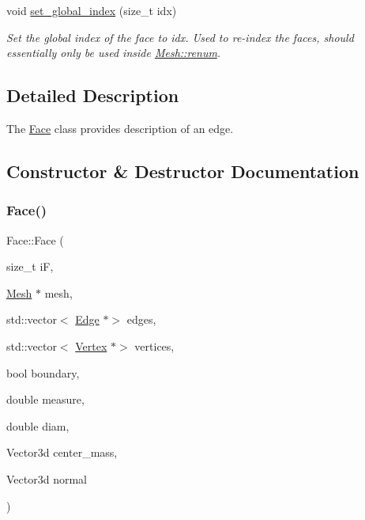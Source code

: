 \begin{DoxyCompactItemize}
\mbox{\label{classHArDCore3D_1_1Face_a66289e0a31138cfce6ac948f09423548}} 
void \hyperlink{classHArDCore3D_1_1Face_a66289e0a31138cfce6ac948f09423548}{set\+\_\+global\+\_\+index} (size\+\_\+t idx)
\begin{DoxyCompactList}\small\item\em Set the global index of the face to idx. Used to re-\/index the faces, should essentially only be used inside \hyperlink{classHArDCore3D_1_1Mesh_af77873bbc892a7a5b37bf4773c55aefc}{Mesh\+::renum}. \end{DoxyCompactList}\end{DoxyCompactItemize}


\subsection{Detailed Description}
The \hyperlink{classHArDCore3D_1_1Face}{Face} class provides description of an edge. 

\subsection{Constructor \& Destructor Documentation}
\mbox{\label{classHArDCore3D_1_1Face_a7dc8f1b50f054d1612862e0ccffe0827}} 
\subsubsection{\texorpdfstring{Face()}{Face()}}
{\footnotesize\ttfamily Face\+::\+Face (\begin{DoxyParamCaption}\item[{size\+\_\+t}]{iF,  }\item[{\hyperlink{classHArDCore3D_1_1Mesh}{Mesh} $\ast$}]{mesh,  }\item[{std\+::vector$<$ \hyperlink{classHArDCore3D_1_1Edge}{Edge} $\ast$$>$}]{edges,  }\item[{std\+::vector$<$ \hyperlink{classHArDCore3D_1_1Vertex}{Vertex} $\ast$$>$}]{vertices,  }\item[{bool}]{boundary,  }\item[{double}]{measure,  }\item[{double}]{diam,  }\item[{Vector3d}]{center\+\_\+mass,  }\item[{Vector3d}]{normal }\end{DoxyParamCaption})}

